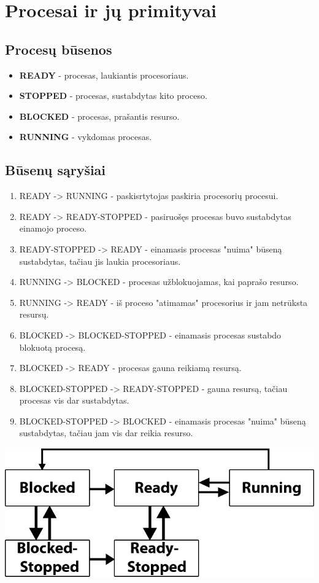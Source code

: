 \section{Procesai ir jų primityvai}
	\subsection{Procesų būsenos}
		\begin{itemize}
			\item \textbf{READY} - procesas, laukiantis procesoriaus.
			\item \textbf{STOPPED} - procesas, sustabdytas kito proceso. 
			\item \textbf{BLOCKED} - procesas, prašantis resurso.
			\item \textbf{RUNNING} - vykdomas procesas.
		\end{itemize}
	\subsection{Būsenų sąryšiai}
		\begin{enumerate}
			\item READY -> RUNNING - paskisrtytojas paskiria procesorių procesui.
			\item READY ->  READY-STOPPED - pasiruošęs procesas buvo sustabdytas einamojo proceso.
			\item READY-STOPPED -> READY - einamasis procesas "nuima" būseną sustabdytas, tačiau jis laukia procesoriaus.
			\item RUNNING -> BLOCKED - procesas užblokuojamas, kai paprašo resurso.
			\item RUNNING -> READY - iš proceso "atimamas" procesorius ir jam netrūksta resursų.
			\item BLOCKED -> BLOCKED-STOPPED - einamasis procesas sustabdo blokuotą procesą.
			\item BLOCKED -> READY - procesas gauna reikiamą resursą.
			\item BLOCKED-STOPPED -> READY-STOPPED - gauna resursą, tačiau procesas vis dar sustabdytas.
			\item BLOCKED-STOPPED -> BLOCKED - einamasis procesas "nuima" būseną sustabdytas, tačiau jam vis dar reikia resurso.
		\end{enumerate}
		\includegraphics[scale=0.75]{kita/ProcessState.png}
